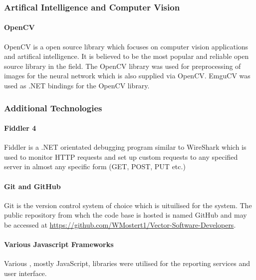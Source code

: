 \documentclass[11pt,a4paper,titlepage]{article}
\begin{document}
	\subsubsection{Artifical Intelligence and Computer Vision}
		\paragraph{OpenCV}
			OpenCV is a open source library which focuses on computer vision applications and artifical intelligence. It is believed to be the most popular and reliable open source library in the field. The OpenCV library was used for preprocessing of images for the neural network which is also supplied via OpenCV. EmguCV was used as .NET bindings for the OpenCV library. 

	\subsubsection{Additional Technologies}
		\paragraph{Fiddler 4}
			Fiddler is a .NET orientated debugging program similar to WireShark which is used to monitor HTTP requests and set up custom requests to any specified server in almost any specific form (GET, POST, PUT etc.)
		\paragraph{Git and GitHub}
			Git is the version control system of choice which is uituilised for the system. The public repository from whch the code base is hosted is named GitHub and may be accessed at \url{https://github.com/WMostert1/Vector-Software-Developers}.
		\paragraph{Various Javascript Frameworks}
			Various , mostly JavaScript, libraries were utilised for the reporting services and user interface.


%  
\end{document}
